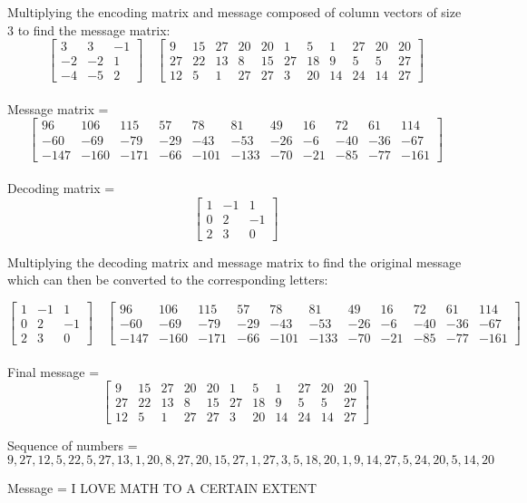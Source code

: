 \documentclass{article}
\begin{document}
\noindent
Multiplying the encoding matrix and message composed of column vectors of size 3 to find the message matrix:
{\center
$$
\begin{bmatrix}
3 & 3 & -1 \\
-2 & -2 & 1 \\
-4 & -5 & 2
\end{bmatrix}
\quad
\begin{bmatrix}
9 & 15 & 27 & 20 & 20 & 1 & 5 & 1 & 27 & 20 & 20 \\
27 & 22 & 13 & 8 & 15 & 27 & 18 & 9 & 5 & 5 & 27\\
12 & 5 & 1 & 27 & 27 & 3 & 20 & 14 & 24 & 14 & 27
\end{bmatrix}
$$ \\
Message matrix =
$$
\begin{bmatrix}
96 & 106 & 115 & 57 & 78 & 81 & 49 & 16 & 72 & 61 & 114\\
-60 & -69 & -79 & -29 & -43 & -53 & -26 & -6 & -40 & -36 & -67 \\
-147 & -160 & -171 & -66 & -101 & -133 & -70 & -21 & -85 & -77 & -161
\end{bmatrix}
$$ \\
Decoding matrix =
$$
\begin{bmatrix}
1 & -1 & 1\\
0 & 2 & -1\\
2 & 3 & 0
\end{bmatrix}
$$
\endcenter}

\noindent
Multiplying the decoding matrix and message matrix to find the original message which can then be converted to the corresponding letters:
{\center
$$
\begin{bmatrix}
1 & -1 & 1\\
0 & 2 & -1\\
2 & 3 & 0
\end{bmatrix}
\quad
\begin{bmatrix}
96 & 106 & 115 & 57 & 78 & 81 & 49 & 16 & 72 & 61 & 114\\
-60 & -69 & -79 & -29 & -43 & -53 & -26 & -6 & -40 & -36 & -67 \\
-147 & -160 & -171 & -66 & -101 & -133 & -70 & -21 & -85 & -77 & -161
\end{bmatrix}
$$ \\

Final message =
$$
\begin{bmatrix}
9 & 15 & 27 & 20 & 20 & 1 & 5 & 1 & 27 & 20 & 20 \\
27 & 22 & 13 & 8 & 15 & 27 & 18 & 9 & 5 & 5 & 27\\
12 & 5 & 1 & 27 & 27 & 3 & 20 & 14 & 24 & 14 & 27
\end{bmatrix}
$$

Sequence of numbers =
$$
9, 27, 12, 5, 22, 5, 27, 13, 1, 20, 8, 27, 20, 15, 27, 1, 27, 3, 5, 18, 20, 1, 9, 14, 27, 5, 24, 20, 5, 14, 20
$$

Message = I LOVE MATH TO A CERTAIN EXTENT
\endcenter}
\end{document}
